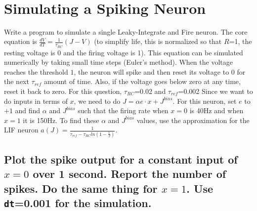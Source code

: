 \documentclass{article}
\begin{document}
    \begin{center}
    \end{center}
    { \hspace*{\fill} \\}
    
\section{Simulating a Spiking Neuron}\label{simulating-a-spiking-neuron}

Write a program to simulate a single Leaky-Integrate and Fire neuron.
The core equation is $\frac{dV}{dT}= \frac{1}{\tau_{RC}} (J - V)$ (to
simplify life, this is normalized so that $R$=1, the resting voltage is
0 and the firing voltage is 1). This equation can be simulated
numerically by taking small time steps (Euler's method). When the
voltage reaches the threshold $1$, the neuron will spike and then reset
its voltage to $0$ for the next $\tau_{ref}$ amount of time. Also, if
the voltage goes below zero at any time, reset it back to zero. For this
question, $\tau_{RC}$=0.02 and $\tau_{ref}$=0.002 Since we want to do
inputs in terms of $x$, we need to do $J = \alpha e \cdot x + J^{bias}$.
For this neuron, set $e$ to $+1$ and find $\alpha$ and $J^{bias}$ such
that the firing rate when $x=0$ is 40Hz and when $x=1$ it is 150Hz. To
find these $\alpha$ and $J^{bias}$ values, use the approximation for the
LIF neuron $a(J)=\frac{1} {\tau_{ref}-\tau_{RC}ln(1-\frac{1}{J})}$.

\subsection{Plot the spike output for a constant input of $x=0$ over 1
second. Report the number of spikes. Do the same thing for $x=1$. Use
\texttt{dt}=0.001 for the
simulation.}\label{a-plot-the-spike-output-for-a-constant-input-of-x0-over-1-second.-report-the-number-of-spikes.-do-the-same-thing-for-x1.-use-dt0.001-for-the-simulation.}
\end{document}
